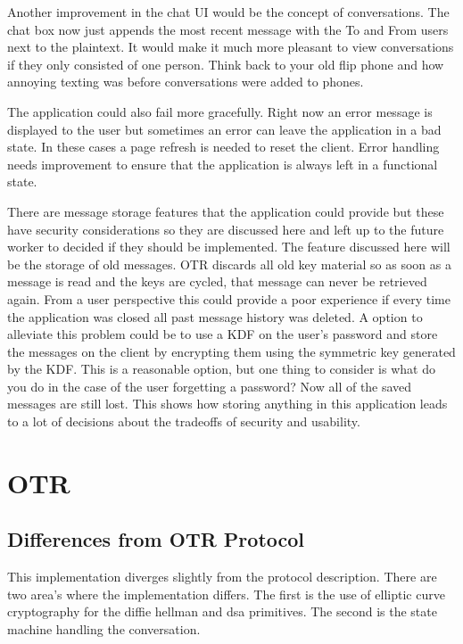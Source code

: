 Another improvement in the chat UI would be the concept of conversations. The chat box now just appends the most recent message with the To and From users next to the plaintext. It would make it much more pleasant to view conversations if they only consisted of one person. Think back to your old flip phone and how annoying texting was before conversations were added to phones.


The application could also fail more gracefully. Right now an error message is displayed to the user but sometimes an error can leave the application in a bad state. In these cases a page refresh is needed to reset the client. Error handling needs improvement to ensure that the application is always left in a functional state.


There are message storage features that the application could provide but these have security considerations so they are discussed here and left up to the future worker to decided if they should be implemented. The feature discussed here will be the storage of old messages. OTR discards all old key material so as soon as a message is read and the keys are cycled, that message can never be retrieved again. From a user perspective this could provide a poor experience if every time the application was closed all past message history was deleted. A option to alleviate this problem could be to use a KDF on the user's password and store the messages on the client by encrypting them using the symmetric key generated by the KDF. This is a reasonable option, but one thing to consider is what do you do in the case of the user forgetting a password? Now all of the saved messages are still lost. This shows how storing anything in this application leads to a lot of decisions about the tradeoffs of security and usability.


\section{OTR}


\subsection{Differences from OTR Protocol}


This implementation diverges slightly from the protocol description.\cite{otr-protocol} There are two area’s where the implementation differs. The first is the use of elliptic curve cryptography for the diffie hellman and dsa primitives. The second is the state machine handling the conversation.



